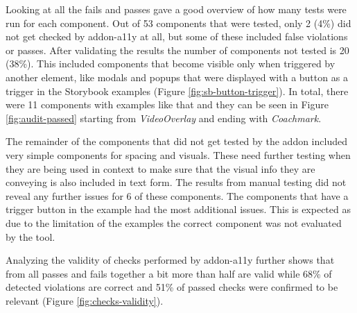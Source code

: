 \documentclass{master_thesis}
\begin{document}
Looking at all the fails and passes gave a good overview of how many tests were run for each component. Out of 53 components that were tested, only 2 (4\%) did not get checked by addon-a11y at all, but some of these included false violations or passes. After validating the results the number of components not tested is 20 (38\%). This included components that become visible only when triggered by another element, like modals and popups that were displayed with a button as a trigger in the Storybook examples (Figure \ref{fig:sb-button-trigger}). In total, there were 11 components with examples like that and they can be seen in Figure \ref{fig:audit-passed} starting from \textit{VideoOverlay} and ending with \textit{Coachmark}.

The remainder of the components that did not get tested by the addon included very simple components for spacing and visuals. These need further testing when they are being used in context to make sure that the visual info they are conveying is also included in text form. The results from manual testing did not reveal any further issues for 6 of these components. The components that have a trigger button in the example had the most additional issues. This is expected as due to the limitation of the examples the correct component was not evaluated by the tool.

Analyzing the validity of checks performed by addon-a11y further shows that from all passes and fails together a bit more than half are valid while 68\% of detected violations are correct and 51\% of passed checks were confirmed to be relevant (Figure \ref{fig:checks-validity}).
\end{document}
